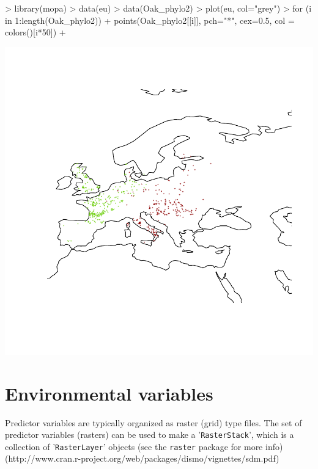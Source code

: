 \documentclass[10pt,a4paper]{report}
\begin{document}
\begin{Schunk}
\begin{Sinput}
> library(mopa)
> data(eu)
> data(Oak_phylo2)
> plot(eu, col="grey")
> for (i in 1:length(Oak_phylo2)){
+   points(Oak_phylo2[[i]], pch="*", cex=0.5, col = colors()[i*50])
+ }
\end{Sinput}
\end{Schunk}
\includegraphics{mopa-mopa2}

\section{Environmental variables}

Predictor variables are typically organized as raster (grid) type files. The set of predictor variables (rasters) can be used to make a '\texttt{RasterStack}', which is a collection of '\texttt{RasterLayer}' objects (see the \texttt{raster} package for more info) (http://www.cran.r-project.org/web/packages/dismo/vignettes/sdm.pdf)
\end{document}
